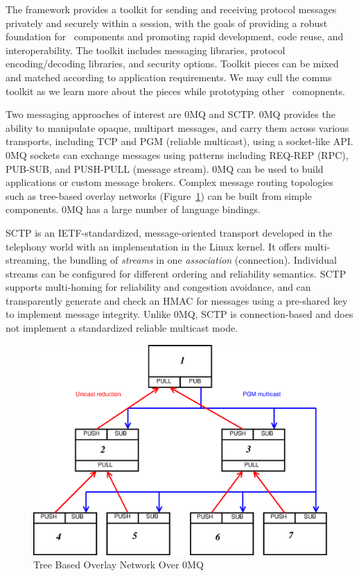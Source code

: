 The framework provides a toolkit for sending and receiving
protocol messages privately and securely within a session,
with the goals of providing a robust foundation for \ngrm\ components
and promoting rapid development, code reuse, and interoperability.
The toolkit includes messaging libraries,
protocol encoding/decoding libraries, and security options.
Toolkit pieces can be mixed and matched according to application
requirements.  We may cull the comms toolkit as we learn more
about the pieces while prototyping other \ngrm\ comopnents.

Two messaging approaches of interest are 0MQ\cite{ZMQGuide} and
SCTP\cite{SCTP}.
0MQ provides the ability to manipulate opaque, multipart messages,
and carry them across various transports, including TCP and
PGM\cite{rfc3208} (reliable multicast), using a socket-like API.
0MQ sockets can exchange messages using patterns including
REQ-REP (RPC), PUB-SUB, and PUSH-PULL (message stream).
0MQ can be used to build applications or custom message brokers.
Complex message routing topologies such as tree-based overlay networks
(Figure~\ref{FigZmqTBON}) can be built from simple components.
0MQ has a large number of language bindings.

SCTP is an IETF-standardized, message-oriented transport developed
in the telephony world with an implementation in the Linux kernel.
It offers multi-streaming, the bundling of {\em streams} in one
{\em association} (connection).  Individual streams can be configured for
different ordering and reliability semantics.  SCTP supports
multi-homing for reliability and congestion avoidance, and
can transparently generate and check an HMAC for messages using a
pre-shared key to implement message integrity.  Unlike 0MQ, SCTP is
connection-based and does not implement a standardized reliable multicast
mode.

\begin{figure}
\centering
\includegraphics[scale=0.35]{../fig/zmqtbon.eps}
\caption{Tree Based Overlay Network Over 0MQ}
\label{FigZmqTBON}
\end{figure}

